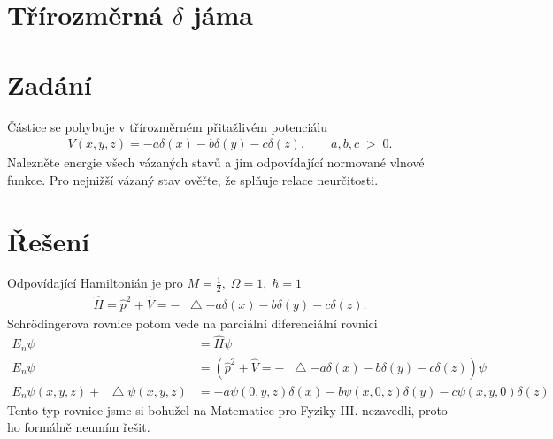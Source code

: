\documentclass[10pt,a4paper]{article}
\newcommand*\Laplace{\mathop{}\!\mathbin\bigtriangleup}
\begin{document}
\section{Třírozměrná \texorpdfstring{$\delta$}{δ} jáma}

\section{Zadání}
Částice se pohybuje v třírozměrném přitažlivém potenciálu
\begin{align*}
    V(x,y,z) = - a \delta(x) - b \delta(y) - c \delta(z),
    \hspace{2em}
    a,b,c \; > \; 0.
\end{align*}
Nalezněte energie všech vázaných stavů a jim odpovídající normované vlnové funkce. Pro nejnižší vázaný stav ověřte, že splňuje relace neurčitosti.

\section{Řešení}
Odpovídající Hamiltonián je pro $M = \frac{1}{2}, \; \Omega = 1, \; \hbar = 1$
\begin{align*}
    \hat{H} = \hat{p}^2 + \hat{V} = -\Laplace - a \delta(x) - b \delta(y) - c \delta(z).
\end{align*}
Schrödingerova rovnice potom vede na parciální diferenciální rovnici
\begin{align*}
    E_n \psi &= \hat{H} \psi
    \\
    E_n \psi &= \left(\hat{p}^2 + \hat{V} = -\Laplace - a \delta(x) - b \delta(y) - c \delta(z)\right) \psi
    \\
    E_n \psi(x,y,z) + \Laplace\psi(x,y,z) &= -a \psi(0,y,z) \delta(x) -b \psi(x,0,z) \delta(y) -c \psi(x,y,0) \delta(z)
\end{align*}
Tento typ rovnice jsme si bohužel na Matematice pro Fyziky III. nezavedli, proto ho formálně neumím řešit.
\end{document}

